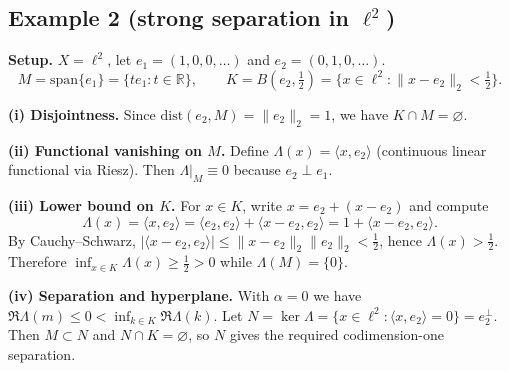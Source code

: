 \documentclass[12pt,a4paper]{article}
\theoremstyle{plain}
\theoremstyle{definition}
\theoremstyle{remark}
\theoremstyle{remark}
\theoremstyle{definition}
\begin{document}
	\bigskip
	\subsection*{Example 2 (strong separation in $\ell^2$)}
	
	\noindent\textbf{Setup.}
	$X=\ell^2$, let $e_1=(1,0,0,\dots)$ and $e_2=(0,1,0,\dots)$.
	\[
	M=\mathrm{span}\{e_1\}=\{t e_1:t\in\mathbb R\},\qquad
	K=B\!\left(e_2,\tfrac12\right)=\{x\in\ell^2:\|x-e_2\|_2<\tfrac12\}.
	\]
	
	\noindent\textbf{(i) Disjointness.}
	Since $\mathrm{dist}(e_2,M)=\|e_2\|_2=1$, we have $K\cap M=\varnothing$.
	
	\noindent\textbf{(ii) Functional vanishing on $M$.}
	Define $\Lambda(x)=\langle x,e_2\rangle$ (continuous linear functional via Riesz).
	Then $\Lambda|_M\equiv 0$ because $e_2\perp e_1$.
	
	\noindent\textbf{(iii) Lower bound on $K$.}
	For $x\in K$, write $x=e_2+(x-e_2)$ and compute
	\[
	\Lambda(x)=\langle x,e_2\rangle
	=\langle e_2,e_2\rangle+\langle x-e_2,e_2\rangle
	=1+\langle x-e_2,e_2\rangle.
	\]
	By Cauchy--Schwarz, $|\langle x-e_2,e_2\rangle|\le \|x-e_2\|_2\|e_2\|_2<\tfrac12$,
	hence $\Lambda(x)>\tfrac12$.
	Therefore $\inf_{x\in K}\Lambda(x)\ge \tfrac12>0$ while $\Lambda(M)=\{0\}$.
	
	\noindent\textbf{(iv) Separation and hyperplane.}
	With $\alpha=0$ we have $\Re\Lambda(m)\le 0<\inf_{k\in K}\Re\Lambda(k)$.
	Let $N=\ker\Lambda=\{x\in\ell^2:\langle x,e_2\rangle=0\}=e_2^\perp$.
	Then $M\subset N$ and $N\cap K=\varnothing$, so $N$ gives the required codimension-one separation.
	
	
	
\end{document}
